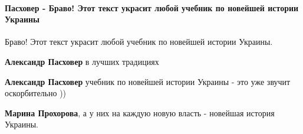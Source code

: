  
 
 
 
 
\paragraph{Пасховер - Браво! Этот текст украсит любой учебник по новейшей истории Украины}
\label{sec:14_07_2021.fb.krjukova_svetlana.1.statja_putina_mnenie.cmt.pashover_bravo}

\begin{itemize}
 
Браво! Этот текст украсит любой учебник по новейшей истории Украины.

\begin{itemize}
 
\textbf{Александр Пасховер} в лучших традициях

 
\textbf{Александр Пасховер} учебник по новейшей истории Украины - это уже звучит оскорбительно ))

 
\textbf{Марина Прохорова}, а у них на каждую новую власть - новейшая история Украины.

 

\end{itemize}
\end{itemize}
